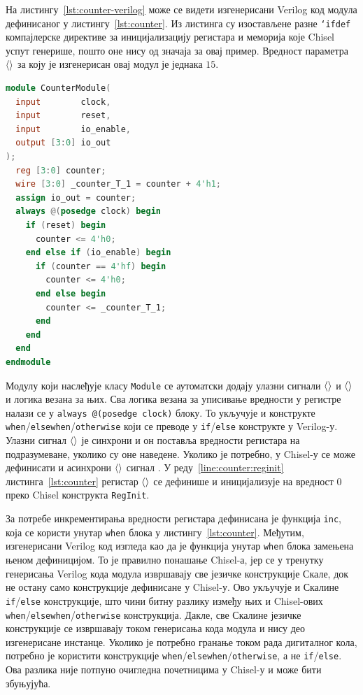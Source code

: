 \documentclass[master]{finthesis}
\newcommand*{\correctmath}[1]{%
    \ifcsname mathCorrectionFor#1\endcsname%
        \csname mathCorrectionFor#1\endcsname%
    \else%
        #1%
    \fi%
}
\newcommand*{\mfield}[1]{{\langle\correctmath{#1}\/\rangle}}
\newcommand*{\field}[1]{\texorpdfstring{$\mfield{#1}$}{⟨#1⟩}}
\newcommand*{\prog}[1]{\texttt{#1}}
\newcommand*{\func}[1]{\prog{#1}}
\begin{document}
На листингу~\ref{lst:counter-verilog} може се видети изгенерисани Verilog код модула дефинисаног у листингу~\ref{lst:counter}. Из листинга су изостављене разне \prog{`ifdef} компајлерске директиве за иницијализацију регистара и меморија које Chisel успут генерише, пошто оне нису од значаја за овај пример. Вредност параметра \field{max} за коју је изгенерисан овај модул је једнака $15$.

\begin{lstlisting}[language=Verilog, caption={Изгенерисани Verilog код модула бројача за вредност параметра $\mfield{max} = 15$.}, label={lst:counter-verilog}]
module CounterModule(
  input        clock,
  input        reset,
  input        io_enable,
  output [3:0] io_out
);
  reg [3:0] counter;
  wire [3:0] _counter_T_1 = counter + 4'h1;
  assign io_out = counter;
  always @(posedge clock) begin
    if (reset) begin
      counter <= 4'h0;
    end else if (io_enable) begin
      if (counter == 4'hf) begin
        counter <= 4'h0;
      end else begin
        counter <= _counter_T_1;
      end
    end
  end
endmodule
\end{lstlisting}

Модулу који наслеђује класу \prog{Module} се аутоматски додају улазни сигнали \field{clock} и \field{reset} и логика везана за њих. Сва логика везана за уписивање вредности у регистре налази се у \prog{always @(posedge clock)} блоку. То укључује и конструкте \prog{when}\slash\prog{elsewhen}\slash\prog{otherwise} који се преводе у \prog{if}\slash\prog{else} конструкте у Verilog-у. Улазни сигнал \field{reset} је синхрони и он поставља вредности регистара на подразумеване, уколико су оне наведене. Уколико је потребно, у Chisel-у се може дефинисати и асинхрони \field{reset} сигнал \cite{chiselresets}. У реду~\ref{line:counter:reginit} листинга~\ref{lst:counter} регистар \field{counter} се дефинише и иницијализује на вредност $0$ преко Chisel конструкта \prog{RegInit}.

За потребе инкрементирања вредности регистара дефинисана је функција \func{inc}, која се користи унутар \prog{when} блока у листингу~\ref{lst:counter}. Међутим, изгенерисани Verilog код изгледа као да је функција унутар \prog{when} блока замењена њеном дефиницијом. То је правилно понашање Chisel-а, јер се у тренутку генерисања Verilog кода модула извршавају све језичке конструкције Скале, док не остану само конструкције дефинисане у Chisel-у. Ово укључује и Скалине \prog{if}\slash\prog{else} конструкције, што чини битну разлику између њих и Chisel-ових \prog{when}\slash\prog{elsewhen}\slash\prog{otherwise} конструкција. Дакле, све Скалине језичке конструкције се извршавају током генерисања кода модула и нису део изгенерисане инстанце. Уколико је потребно гранање током рада дигиталног кола, потребно је користити конструкције \prog{when}\slash\prog{elsewhen}\slash\prog{otherwise}, а не \prog{if}\slash\prog{else}. Ова разлика није потпуно очигледна почетницима у Chisel-у и може бити збуњујућа.
\end{document}
